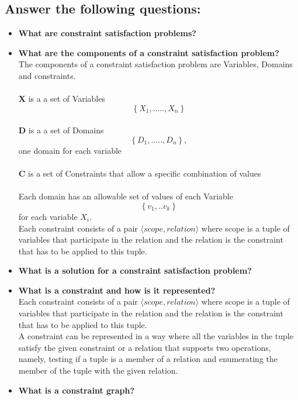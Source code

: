 \documentclass[11pt]{article}
\begin{document}
\subsection{Answer the following questions:}
	\begin{itemize}
		\item\textbf{What are constraint satisfaction problems?}\\
		
		\item\textbf{What are the components of a constraint satisfaction problem?}\\
		The components of a constraint satisfaction problem are Variables, Domains and constraints. \\\\
		\textbf X is a a set of Variables $$\left\{X_1,.....,X_n\right\}$$\\
		\textbf D is a a set of Domains $$\left\{D_1,.....,D_n\right\},$$ one domain for each variable\\\\
		\textbf C is a set of Constraints that allow a specific combination of values\\\\
		Each domain has an allowable set of values of each Variable $$\left\{v_1,..v_k\right\}$$ for each variable $X_i$.\\
		Each constraint consists of a pair $\langle scope, relation \rangle$ where scope is a tuple of variables that participate in the relation and the relation is the constraint that has to be applied to this tuple.
		
		\item\textbf{What is a solution for a constraint satisfaction problem?}\\
		
		\item\textbf{What is a constraint and how is it represented?}\\
		Each constraint consists of a pair $\langle scope, relation \rangle$ where scope is a tuple of variables that participate in the relation and the relation is the constraint that has to be applied to this tuple.\\ A constraint can be represented in a way where all the variables in the tuple satisfy the given constraint or a relation that supports two operations, namely, testing if a tuple is a member of a relation and enumerating the member of the tuple with the given relation.
		
		
		\item\textbf{What is a constraint graph?}\\
		

\end{itemize}
\end{document}
